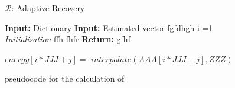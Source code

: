 \begin{frame}
\begin{algorithm}
	\caption{$ \mathcal{R} $: Adaptive Recovery}
	\label{alg:AR}
	\begin{algorithmic}[1]
		 \textbf{Input:} Dictionary 
		\textbf{Input:}  Estimated vector fgfdhgh
		\FOR i =1
		\\ \textit{Initialisation} ffh
		\STATE fhfr
		\ENDFOR
		\textbf{Return:} gfhf
	\end{algorithmic} 
\end{algorithm}
\end{frame}



\begin{latin}
\begin{frame}

\begin{algorithm}[H]
\begin{algorithmic}[1]
\STATE $energy[i*JJJ+j] =$ 
$ interpolate(AAA[i*JJJ+j], ZZZ)$
\ENDFOR
\ENDFOR
\end{algorithmic}
\caption{pseudocode for the calculation of }
\label{alg:seq}
\end{algorithm}
\end{frame}
\end{latin}
